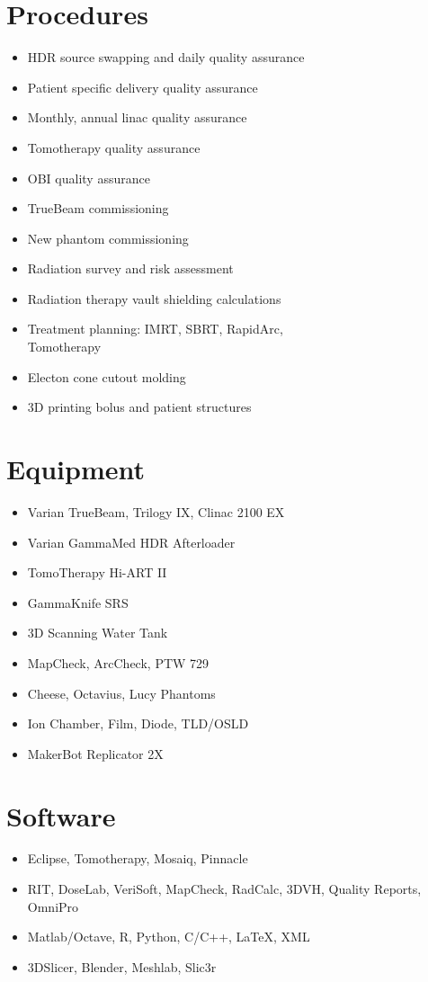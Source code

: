 \documentclass[margin]{res}
\begin{document}
\begin{resume}
\section{Procedures}
\begin{itemize}[noitemsep]
    \item HDR source swapping and daily quality assurance
    \item Patient specific delivery quality assurance
    \item Monthly, annual linac quality assurance
    \item Tomotherapy quality assurance
    \item OBI quality assurance
    \item TrueBeam commissioning
    \item New phantom commissioning
    \item Radiation survey and risk assessment
    \item Radiation therapy vault shielding calculations
    \item Treatment planning: IMRT, SBRT, RapidArc, \\ Tomotherapy
    \item Electon cone cutout molding
    \item 3D printing bolus and patient structures
\end{itemize}

\section{Equipment}
\begin{itemize}[noitemsep]
    \item Varian TrueBeam, Trilogy IX, Clinac 2100 EX
    \item Varian GammaMed HDR Afterloader
    \item TomoTherapy Hi-ART II
    \item GammaKnife SRS
    \item 3D Scanning Water Tank
    \item MapCheck, ArcCheck, PTW 729
    \item Cheese, Octavius, Lucy Phantoms
    \item Ion Chamber, Film, Diode, TLD/OSLD
    \item MakerBot Replicator 2X
\end{itemize}

\section{Software}
\begin{itemize}[noitemsep]
    \item Eclipse, Tomotherapy, Mosaiq, Pinnacle
    \item RIT, DoseLab, VeriSoft, MapCheck, RadCalc, 3DVH, Quality Reports, OmniPro
    \item Matlab/Octave, R, Python, C/C++, LaTeX, XML
    \item 3DSlicer, Blender, Meshlab, Slic3r
\end{itemize}


\end{resume}
\end{document}
